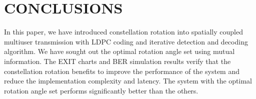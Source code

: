 \documentclass[conference]{IEEEtran}
\begin{document}
\section{CONCLUSIONS}
In this paper, we have introduced constellation rotation into spatially coupled multiuser transmission with LDPC coding and iterative detection and decoding algorithm. We have sought out the optimal rotation angle set using mutual information. The EXIT charts and BER simulation results verify that the constellation rotation benefits to improve the performance of the system and reduce the implementation complexity and latency. The system with the optimal rotation angle set performs significantly better than the others.








\end{document}
